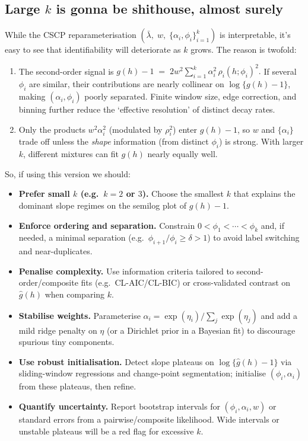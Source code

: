 \documentclass[11pt]{article}
\begin{document}
\subsection{Large $k$ is gonna be shithouse, almost surely}

While the CSCP reparameterisation $(\bar\lambda,\; w,\; \{\alpha_i,\phi_i\}_{i=1}^k)$ is interpretable, it's easy to see that identifiability will deteriorate as $k$ grows. The reason is twofold:

\begin{enumerate}
	\item 
	The second-order signal is
	\(
	g(h)-1 \;=\; 2w^2\sum_{i=1}^k \alpha_i^2\,\rho_i(h;\phi_i)^2.
	\)
	If several $\phi_i$ are similar, their contributions are nearly collinear on $\log\{g(h)-1\}$, 
	making $(\alpha_i,\phi_i)$ poorly separated. Finite window size, edge correction, and binning 
	further reduce the `effective resolution' of distinct decay rates.
	
	\item 
	Only the products $w^2\alpha_i^2$ (modulated by $\rho_i^2$) enter $g(h)-1$, 
	so $w$ and $\{\alpha_i\}$ trade off unless the \emph{shape} information (from distinct $\phi_i$) is strong. 
	With larger $k$, different mixtures can fit $g(h)$ nearly equally well.
\end{enumerate}

So, if using this version we should:
\begin{itemize}
	\item \textbf{Prefer small $k$ (e.g.\ $k=2$ or $3$).}
	Choose the smallest $k$ that explains the dominant slope regimes on the semilog plot of $\hat g(h)-1$.
	\item \textbf{Enforce ordering and separation.}
	Constrain $0<\phi_1<\cdots<\phi_k$ and, if needed, a minimal separation 
	(e.g.\ $\phi_{i+1}/\phi_i \ge \delta>1$) to avoid label switching and near-duplicates.
	\item \textbf{Penalise complexity.}
	Use information criteria tailored to second-order/composite fits (e.g.\ CL-AIC/CL-BIC) 
	or cross-validated contrast on $\hat g(h)$ when comparing $k$.
	\item \textbf{Stabilise weights.}
	Parameterise $\alpha_i=\exp(\eta_i)/\sum_j \exp(\eta_j)$ 
	and add a mild ridge penalty on $\eta$ (or a Dirichlet prior in a Bayesian fit) 
	to discourage spurious tiny components.
	\item \textbf{Use robust initialisation.}
	Detect slope plateaus on $\log\{\hat g(h)-1\}$ via sliding-window regressions 
	and change-point segmentation; initialise $(\phi_i,\alpha_i)$ from these plateaus, then refine.
	\item \textbf{Quantify uncertainty.}
	Report bootstrap intervals for $(\phi_i,\alpha_i,w)$ 
	or standard errors from a pairwise/composite likelihood.
	Wide intervals or unstable plateaus will be a red flag for excessive $k$.
\end{itemize}
\end{document}
